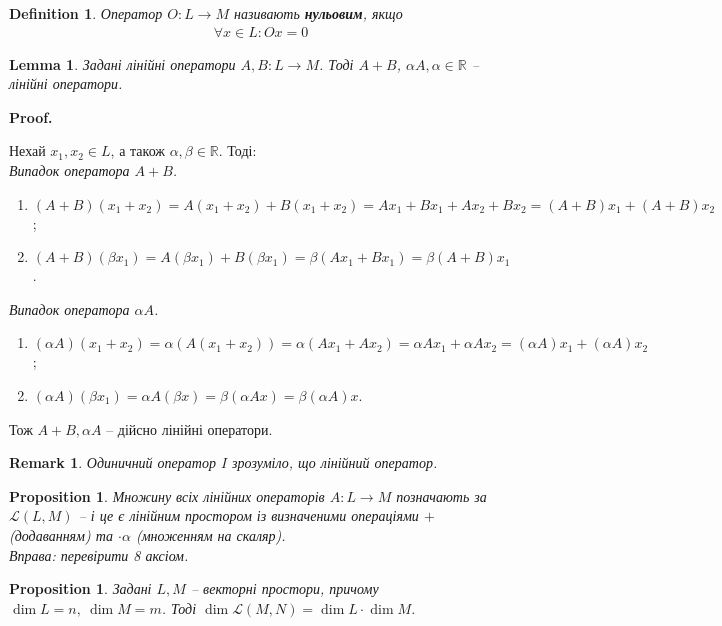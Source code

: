 \documentclass[a4paper, 10pt]{article}
\makeatletter
\theoremstyle{theoremdd}
\newtheorem{definition}[theorem]{Definition}
\newtheorem{proposition}[theorem]{Proposition}
\newtheorem{remark}[theorem]{Remark}
\newtheorem{lemma}[theorem]{Lemma}
\renewenvironment{proof}[1][Proof.\\]{\par
\pushQED{\hfill \qed}%
\normalfont \topsep6\p@\@plus6\p@\relax
\trivlist
\item\relax
{\bfseries
#1\@addpunct{.}}\hspace\labelsep\ignorespaces
}{%
\popQED\endtrivlist\@endpefalse
}
\makeatother
\begin{document}
	\begin{definition}
	Оператор $O \colon L \to M$ називають \textbf{нульовим}, якщо
	\begin{align*}
	\forall x \in L: Ox = 0
	\end{align*}
	\end{definition}
	
	\begin{lemma}
	Задані лінійні оператори $A,B \colon L \to M$. Тоді $A+B$, $\alpha A, \alpha \in \mathbb{R}$ -- лінійні оператори.
	\end{lemma}
	
	\begin{proof}
	Нехай $x_1,x_2 \in L$, а також $\alpha,\beta \in \mathbb{R}$. Тоді:\\
	\textit{Випадок оператора $A+B$.}
	\begin{enumerate}[nosep, wide=0pt, label={\arabic*)}]
	\item $(A+B)(x_1+x_2) = A(x_1+x_2)+B(x_1+x_2)=Ax_1+Bx_1+Ax_2+Bx_2=(A+B)x_1 + (A+B)x_2$;
	\item $(A+B)(\beta x_1) = A(\beta x_1)+B(\beta x_1)=\beta (Ax_1+Bx_1) = \beta(A+B)x_1$.
	\end{enumerate}
	\noindent
	\textit{Випадок оператора $\alpha A$.}
	\begin{enumerate}[nosep, wide=0pt, label={\arabic*)}]
	\item $(\alpha A)(x_1+x_2) = \alpha(A(x_1+x_2))=\alpha(Ax_1 + Ax_2) = \alpha Ax_1 + \alpha Ax_2 = (\alpha A)x_1 + (\alpha A)x_2$;
	\item $(\alpha A) (\beta x_1) = \alpha A(\beta x) = \beta(\alpha Ax) = \beta (\alpha A)x$.
	\end{enumerate}
	\noindent
	Тож $A+B, \alpha A$ -- дійсно лінійні оператори.
	\end{proof}
	
	\begin{remark}
	Одиничний оператор $I$ зрозуміло, що лінійний оператор.
	\end{remark}
	
	\begin{proposition}
	Множину всіх лінійних операторів $A \colon L \to M$ позначають за $\mathcal{L}(L,M)$ -- і це є лінійним простором із визначеними операціями $+$ (додаванням) та $\cdot \alpha$ (множенням на скаляр).\\
	\textit{Вправа: перевірити 8 аксіом.}
	\end{proposition}
	
	\begin{proposition}
	\label{dimension_of_space_of_linear_operators}
	Задані $L,M$ -- векторні простори, причому $\dim L = n,\ \dim M = m$. Тоді $\dim \mathcal{L}(M,N) = \dim L \cdot \dim M$.
	\end{proposition}
	
\end{document}
